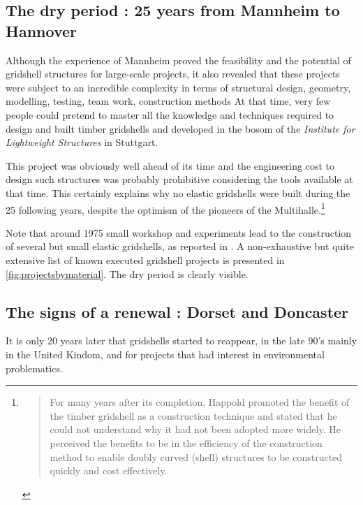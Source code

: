 \subsection{The dry period : 25 years from Mannheim to Hannover}

Although the experience of Mannheim proved the feasibility and the potential of gridshell structures for large-scale projects, it also revealed that these projects were subject to an incredible complexity in terms of structural design, geometry, modelling, testing, team work, construction methods \telp{} At that time, very few people could pretend to master all the knowledge and techniques required to design and built timber gridshells and developed in the bosom of the \emph{Institute for Lightweight Structures} in Stuttgart.

This project was obviously well ahead of its time and the engineering cost to design such structures was probably prohibitive considering the tools available at that time. This certainly explains why no elastic gridshells were built during the 25 following years, despite the optimism of the pioneers of the Multihalle.\footnote{\blockcquote[]{Harris2003}{For many years after its completion, Happold promoted the benefit of the timber gridshell as a construction technique and stated that he could not understand why it had not been adopted more widely. He perceived the benefits to be in the efficiency of the construction method to enable doubly curved (shell) structures to be constructed quickly and cost effectively.}.}

Note that around 1975 small workshop and experiments lead to the construction of several but small elastic gridshells, as reported in \cite{IL10}. A non-exhaustive but quite extensive list of known executed gridshell projects is presented in \cref{fig:projectsbymaterial}. The dry period is clearly visible.

\subsection{The signs of a renewal : Dorset and Doncaster}\label{sec=signs}

It is only 20 years later that gridshells started to reappear, in the late 90's mainly in the United Kindom, and for projects that had interest in environmental problematics.

